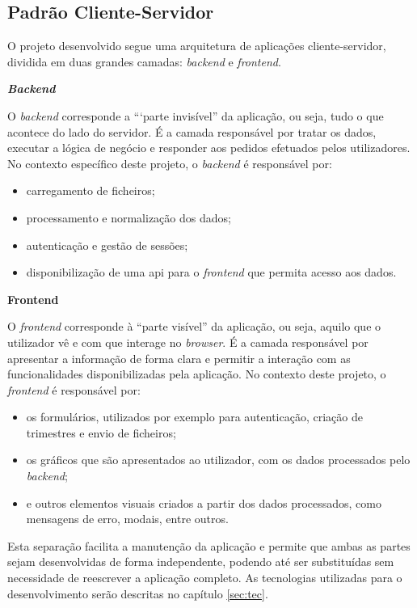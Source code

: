 \subsection{Padrão Cliente-Servidor}

O projeto desenvolvido segue uma arquitetura de aplicações cliente-servidor, dividida em duas grandes camadas: \textit{backend} e \textit{frontend}.

\textbf{\textit{Backend}}

O \textit{backend} corresponde a ```parte invisível” da aplicação, ou seja, tudo o que acontece do lado do servidor. É a camada responsável por tratar os dados, executar a lógica de negócio e responder aos pedidos efetuados pelos utilizadores. No contexto específico deste projeto, o \textit{backend} é responsável por:

\begin{itemize}
    \item carregamento de ficheiros;
    \item processamento e normalização dos dados;
    \item autenticação e gestão de sessões;
    \item disponibilização de uma \gls{api} para o \textit{frontend} que permita acesso aos dados.
\end{itemize}

\textbf{Frontend}

O \textit{frontend} corresponde à ``parte visível'' da aplicação, ou seja, aquilo que o utilizador vê e com que interage no \textit{browser}. É a camada responsável por apresentar a informação de forma clara e permitir a interação com as funcionalidades disponibilizadas pela aplicação. No contexto deste projeto, o \textit{frontend} é responsável por:
\begin{itemize}
    \item os formulários, utilizados por exemplo para autenticação, criação de trimestres e envio de ficheiros;
    \item os gráficos que são apresentados ao utilizador, com os dados processados pelo \textit{backend};
    \item e outros elementos visuais criados a partir dos dados processados, como mensagens de erro, modais, entre outros.
\end{itemize}

Esta separação facilita a manutenção da aplicação e permite que ambas as partes sejam desenvolvidas de forma independente, podendo até ser substituídas sem necessidade de reescrever a aplicação completo. As tecnologias utilizadas para o desenvolvimento serão descritas no capítulo \ref{sec:tec}.

